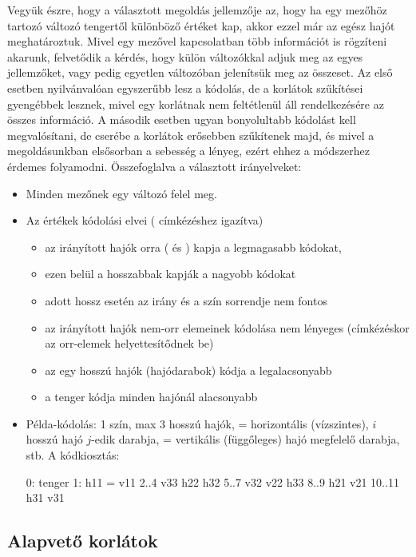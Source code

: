 Vegyük észre, hogy a választott megoldás jellemzője az, hogy ha egy mezőhöz tartozó
változó tengertől különböző értéket kap, akkor ezzel már az egész hajót meghatároztuk.
\br
Mivel egy mezővel kapcsolatban több információt is rögzíteni akarunk, felvetődik a kérdés,
hogy külön változókkal adjuk meg az egyes jellemzőket, vagy pedig egyetlen változóban
jelenítsük meg az összeset. Az első esetben nyilvánvalóan egyszerűbb lesz a kódolás,
de a korlátok szűkítései gyengébbek lesznek, mivel egy korlátnak nem feltétlenül
áll rendelkezésére az összes információ. A második esetben ugyan bonyolultabb kódolást
kell megvalósítani, de cserébe a korlátok erősebben szűkítenek majd, és mivel a
megoldásunkban elsősorban a sebesség a lényeg, ezért ehhez a módszerhez érdemes folyamodni.
\br
Összefoglalva a választott irányelveket:

\begin{itemize}
\item Minden mezőnek egy változó felel meg.
\item Az értékek kódolási elvei ( címkézéshez igazítva)
\begin{itemize}
\item az irányított hajók orra ( és ) kapja a legmagasabb
kódokat,
\item ezen belül a hosszabbak kapják a nagyobb kódokat
\item adott hossz esetén az irány és a szín sorrendje nem fontos
\item az irányított hajók nem-orr elemeinek kódolása nem lényeges (címkézéskor
az orr-elemek helyettesítődnek be)
\item az egy hosszú hajók (hajódarabok) kódja a legalacsonyabb
\item a tenger kódja minden hajónál alacsonyabb
\end{itemize}
\item Példa-kódolás: 1 szín, max 3 hosszú hajók,  = horizontális (vízszintes),
$i$ hosszú hajó $j$-edik darabja,  = vertikális (függőleges) hajó megfelelő
darabja, stb. A kódkiosztás:

\begin{prologcode}
0:       tenger
1:       h11 = v11      %
2..4     v33  h22 h32   %
5..7     v32 v22  h33   %
8..9     h21 v21        %
10..11   h31 v31        %
\end{prologcode}
\end{itemize}

\subsection{Alapvető korlátok}

